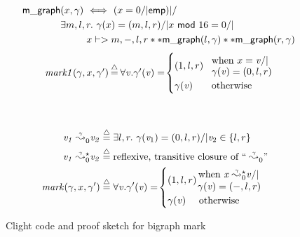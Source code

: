 \begin{figure}[t]
{\footnotesize
\begin{flushleft}
\hspace{-3em}
\begin{minipage}[c]{0.55\textwidth}
\begin{equation}
\label{eqn:bigraphintrofoldunfold}
\begin{split}
\quad \p{m\_graph}&(x, \gamma) ~ <=> ~ (x = 0 /| \p{emp}) |/ \null \\
& \exists m,l,r.~ \gamma(x)=(m,l,r) /| x~\mathsf{mod}~16 = 0 /| \null \\
& \qquad ~~ x |-> m,-,l,r ** \p{m\_graph}(l, \gamma) ** \p{m\_graph}(r, \gamma)
\end{split}
\end{equation}
\begin{equation*}
\begin{array}{l@{\hspace{2pt}}c@{\hspace{2pt}}l}
\quad \m{mark1}(\gamma,x,\gamma') & \defeq & \forall \m{v}. \gamma'(\m{v}) = \! \begin{cases}
(1,l,r) \! & \begin{array}{@{}l@{}}\text{when } x = \m{v} /| \null \\[-3pt] \gamma(\m{v}) = (0,l,r) \end{array} \\
\gamma(\m{v}) & \text{otherwise}
\end{cases}
\end{array}
\end{equation*}
\end{minipage}
~~ \vline
\begin{minipage}[c]{0.4\textwidth}
\begin{equation*}
\begin{split}
\reachable{v_1}{\gamma}{}{0}{v_2}\;\defeq\; &\exists l,r.~ \gamma(\m{v}_1) = (0,l,r) /| \m{v}_2 \in \{ l,r\} \\
\reachable{v_1}{\gamma}{\star}{0}{v_2}\;\defeq\;&\text{reflexive, transitive closure of ``} \reachable{}{\gamma}{}{0}{}\text{''}
\\
\;\; \m{mark}(\gamma,x,\gamma')\;\defeq\;&
\forall \m{v}. \gamma'(\m{v}) = \!
\begin{cases}
(1,l,r) \!
\begin{array}{@{}l@{}}\text{ when }
\reachable{x}{\gamma}{\star}{0}{v} /| \null \\[-2pt] \; \gamma(\m{v}) = (-,l,r)
\end{array}\\
\gamma(\m{v}) \quad \text{ otherwise}
\end{cases}
\end{split}
\end{equation*}
\end{minipage}
\end{flushleft}
}

\vspace{-0.4em}
\caption{Clight code and proof sketch for bigraph mark}
\label{fig:markgraph}
\vspace{-1em}
\end{figure}

